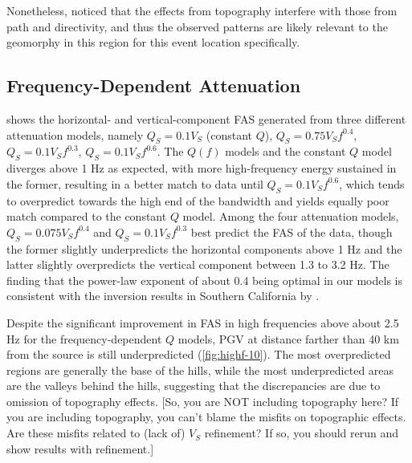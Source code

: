 Nonetheless, \citet{leeEffectsRealisticSurface2009} noticed that the effects from topography interfere with those from path and directivity, and thus the observed patterns are likely relevant to the geomorphy in this region for this event location specifically.


\subsection{Frequency-Dependent Attenuation}
 shows the horizontal- and vertical-component FAS generated from three different attenuation models, namely $Q_S=0.1V_S$ (constant $Q$), $Q_S=0.75V_Sf^{0.4}$, $Q_S=0.1V_Sf^{0.3}$, $Q_S=0.1V_Sf^{0.6}$. The $Q(f)$ models and the constant $Q$ model diverges above 1 Hz as expected, with more high-frequency energy sustained in the former, resulting in a better match to data until $Q_S=0.1V_Sf^{0.6}$, which tends to overpredict towards the high end of the bandwidth and yields equally poor match compared to the constant $Q$ model. Among the four attenuation models, $Q_S=0.075V_Sf^{0.4}$ and $Q_S=0.1V_Sf^{0.3}$ best predict the FAS of the data, though the former slightly underpredicts the horizontal components above 1 Hz and the latter slightly overpredicts the vertical component between 1.3 to 3.2 Hz. The finding that the power-law exponent of about 0.4 being optimal in our models is consistent with the inversion results in Southern California by \citet{linFrequencyDependentAttenuationWaves2018}.

Despite the significant improvement in FAS in high frequencies above about 2.5 Hz for the frequency-dependent $Q$ models, PGV at distance farther than 40 km from the source is still underpredicted (\cref{fig:highf-10}). The most overpredicted regions are generally the base of the hills, while the most underpredicted areas are the valleys behind the hills, suggesting that the discrepancies are due to omission of topography effects. [So, you are NOT including topography here? If you are including topography, you can’t blame the misfits on topographic effects. Are these misfits related to (lack of) $V_S$ refinement? If so, you should rerun and show results with refinement.]

